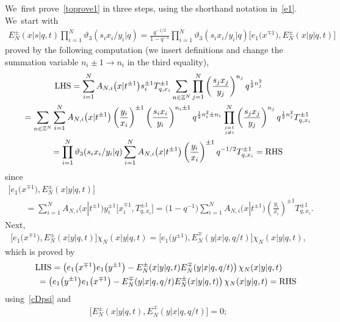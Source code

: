 \documentclass[pdftex]{sigma}%
\numberwithin{equation}{section}
\newcommand{\setatop}[2]{\genfrac{}{}{0pt}{}{#1}{#2}}
\newcommand{\Z}{{\mathbb Z}}
\begin{document}
We~first prove~\eqref{toprove1} in three steps, using the shorthand notation in~\eqref{e1}. We~start with
\begin{gather}
\label{Id1}
E^\pm_N(x|s|q,t) \prod_{i=1}^N\vartheta_3(s_ix_i/y_i|q) = \frac{q^{-1/2}}{1-q^{-1}}\prod_{i=1}^N\vartheta_3(s_ix_i/y_i|q) \big[e_1\big(x^{\mp 1}\big),E^\pm_N(x|y|q,t)\big]
\end{gather}
proved by the following computation (we insert definitions and change the summation variable $n_i\pm 1\to n_i$ in the third equality),
\begin{gather*}
\text{LHS} = \sum_{i=1}^N A_{N,i}\big(x|t^{\pm 1}\big) s^{\pm 1}_i T_{q,x_i}^{\pm 1} \sum_{n\in\Z^N} \prod_{j=1}^N\left(\frac{s_j x_j}{y_j} \right)^{n_j}q^{\frac12 n_j^2}
\\ \hphantom{\text{LHS}}
{}= \sum_{n\in\Z^N} \sum_{i=1}^N A_{N,i}\big(x|t^{\pm 1}\big) \left(\frac{y_i}{x_i}\right)^{\pm 1} \left(\frac{s_i x_i}{y_i} \right)^{n_i\pm 1}q^{\frac12n_i^2\pm n_i} \prod_{\setatop{j=1}{j\neq i}}^N\left(\frac{s_j x_j}{y_j} \right)^{n_j}q^{\frac12 n_j^2} T_{q,x_i}^{\pm 1}
\\ \hphantom{\text{LHS}}
{}= \prod_{i=1}^N\vartheta_3(s_ix_i/y_i|q) \sum_{i=1}^N A_{N,i}\big(x|t^{\pm 1}\big) \left( \frac{y_i}{x_i}\right)^{\pm 1} q^{-1/2} T_{q,x_i}^{\pm 1} =\text{RHS}
\end{gather*}
since
\begin{gather*}
\big[e_1\big(x^{\mp 1}\big),E^\pm_N(x|y|q,t)\big]
\\
\qquad
{}= \sum_{i=1}^N A_{N,i}\big(x|t^{\pm 1}\big) y_i^{\pm 1}\big[x_i^{\mp 1},T_{q,x_i}^{\pm 1}\big]
 = \big(1-q^{-1}\big)\sum_{i=1}^N A_{N,i}\big(x|t^{\pm 1}\big) \left(\frac{y_i}{x_i}\right)^{\pm 1}T_{q,x_i}^{\pm 1} .
\end{gather*}
Next,
\begin{gather}
\label{Id2}
\big[e_1\big(x^{\mp 1}\big),E^\pm_N(x|y|q,t)\big] \chi_N(x|y|q,t)= \big[e_1\big(y^{\pm 1}\big),E^\mp_N(y|x|q,q/t)\big] \chi_N(x|y|q,t) ,
\end{gather}
which is proved by
\begin{gather*}
\text{LHS} = \left(e_1\big(x^{\mp 1}\big)e_1\big(y^{\pm 1}\big)- E^\pm_N(x|y|q,t)E^\mp_N(y|x|q,q/t) \right)\chi_N(x|y|q,t)
\\ \hphantom{\text{LHS}}
{}= \left(e_1\big(y^{\pm 1}\big) e_1\big(x^{\mp 1}\big)- E^\mp_N(y|x|q,q/t)E^\pm_N(x|y|q,t) \right)\chi_N(x|y|q,t) = \text{RHS}
\end{gather*}
using~\eqref{cDpsi} and
\begin{gather*}
\big[ E^\pm_N(x|y|q,t),E^\mp_N(y|x|q,q/t)\big]=0;
\end{gather*}
\end{document}
